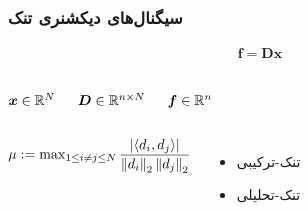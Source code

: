\begin{frame}
\frametitle{سیگنال‌های دیکشنری تنک}
\begin{align}
\label{eq7}
\bm{f} = \bm{D}\bm{x}
\end{align}
\begin{columns}
\begin{center}
$\bm{x}\in \mathbb{R}^{N}$
\end{center}
\begin{center}
$\bm{D}\in \mathbb{R}^{n\times N}$
\end{center}
\begin{center}
$\bm{f}\in \mathbb{R}^{n}$
\end{center}
\end{columns}

\begin{columns}
\begin{block}{}
$\mu := \max_{1\leq i\neq j\leq N} \dfrac{| \langle d_{i},d_{j}\rangle|}{\left\lVert d_{i}\right\rVert_{2}\left\lVert d_{j}\right\rVert_{2}}$
\end{block}
\begin{itemize}
\item{
تنک-ترکیبی
}
\item{
تنک-تحلیلی
}
\end{itemize}
\end{columns}
\end{frame}
